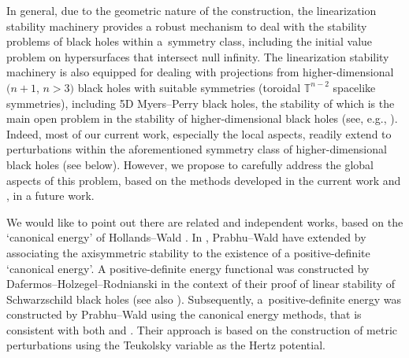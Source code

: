 \documentclass[pdftex]{sigma}
\numberwithin{equation}{section}
\begin{document}
 In general, due to the geometric nature of the construction, the linearization stability machinery provides a robust mechanism to deal with the stability problems of black holes within a~symmetry class, including the initial value problem on hypersurfaces that intersect null infinity. The linearization stability machinery is also equipped for dealing with projections from higher-dimensional $(n+1$, $n>3)$ black holes with suitable symmetries \big(toroidal $\mathbb{T}^{n-2}$ spacelike symmetries\big), including 5D Myers--Perry black holes, the stability of which is the main open problem in the stability of higher-dimensional black holes (see, e.g., \cite{EmRe_08}). Indeed, most of our current work, especially the local aspects, readily extend to perturbations within the aforementioned symmetry class of higher-dimensional black holes (see below). However, we propose to carefully address the global aspects of this problem, based on the methods developed in the current work and \cite{GM17_gentitle}, in a future work.

We would like to point out there are related and independent works, based on the `canonical energy' of Hollands--Wald \cite{WH_13}. In \cite{WP_13}, Prabhu--Wald have extended \cite{WH_13} by associating the axisymmetric stability to the existence of a positive-definite `canonical energy'. A positive-definite energy functional was constructed by Dafermos--Holzegel--Rodnianski \cite{HDR_16} in the context of their proof of linear stability of Schwarzschild black holes (see also \cite{GH_16}). Subsequently, a~positive-definite energy was constructed by Prabhu--Wald using the canonical energy methods, that is consistent with both \cite{HDR_16} and \cite{Moncrief_74}. Their approach is based on the construction of metric perturbations using the Teukolsky variable as the Hertz potential.
\end{document}
